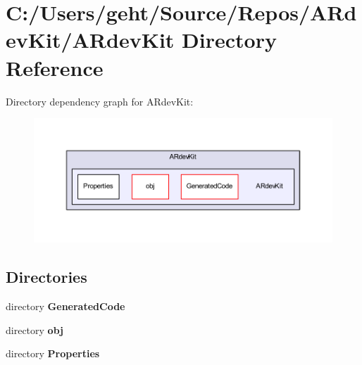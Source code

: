 \section{C\-:/\-Users/geht/\-Source/\-Repos/\-A\-Rdev\-Kit/\-A\-Rdev\-Kit Directory Reference}
\label{dir_91d8ee31da1121e5be080b894e25f664}
Directory dependency graph for A\-Rdev\-Kit\-:
\nopagebreak
\begin{figure}[H]
\begin{center}
\leavevmode
\includegraphics[width=350pt]{dir_91d8ee31da1121e5be080b894e25f664_dep}
\end{center}
\end{figure}
\subsection*{Directories}
\begin{DoxyCompactItemize}
\item 
directory {\bf Generated\-Code}
\item 
directory {\bf obj}
\item 
directory {\bf Properties}
\end{DoxyCompactItemize}
